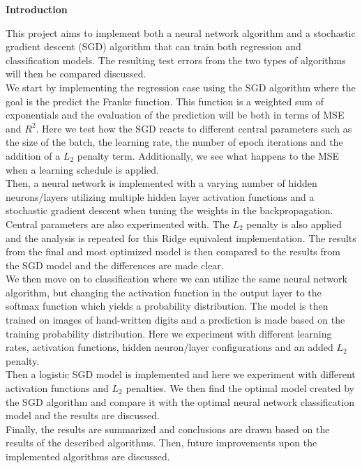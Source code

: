 \documentclass[12pt,a4paper]{article}
\begin{document}
\newpage

\begin{center}
\Large{\textbf{Introduction}}
\end{center}

\noindent This project aims to implement both a neural network algorithm and a stochastic gradient descent (SGD) algorithm that can train both regression and classification models. The resulting test errors from the two types of algorithms will then be compared discussed. 
\\
We start by implementing the regression case using the SGD algorithm where the goal is the predict the Franke function. This function is a weighted sum of exponentials and the evaluation of the prediction will be both in terms of MSE and $R^2$. Here we test how the SGD reacts to different central parameters such as the size of the batch, the learning rate, the number of epoch iterations and the addition of a $L_2$ penalty term. Additionally, we see what happens to the MSE when a learning schedule is applied.
\\
Then, a neural network is implemented with a varying number of hidden neurons/layers utilizing multiple hidden layer activation functions and a stochastic gradient descent when tuning the weights in the backpropagation. Central parameters are also experimented with. The $L_2$ penalty is also applied and the analysis is repeated for this Ridge equivalent implementation. The results from the final and most optimized model is then compared to the results from the SGD model and the differences are made clear.
\\
We then move on to classification where we can utilize the same neural network algorithm, but changing the activation function in the output layer to the softmax function which yields a probability distribution. The model is then trained on images of hand-written digits and a prediction is made based on the training probability distribution. Here we experiment with different learning rates, activation functions, hidden neuron/layer configurations and an added $L_2$ penalty. 
\\
Then a logistic SGD model is implemented and here we experiment with different activation functions and $L_2$ penalties. We then find the optimal model created by the SGD algorithm and compare it with the optimal neural network classification model and the results are discussed.
\\
Finally, the results are summarized and conclusions are drawn based on the results of the described algorithms. Then, future improvements upon the implemented algorithms are discussed.
\end{document}
